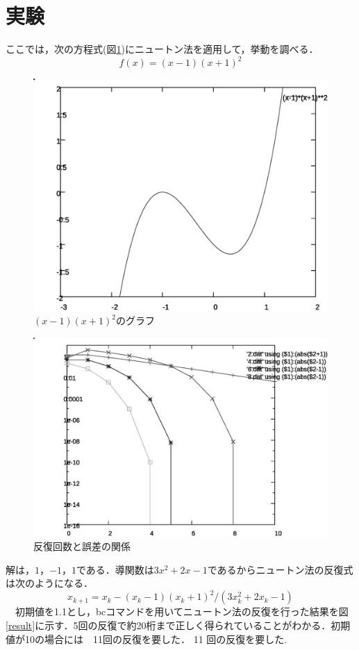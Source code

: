 \documentclass[a4j,11pt]{jarticle}
\begin{document}
\section{実験}
ここでは，次の方程式(図\ref{1})にニュートン法を適用して，挙動を調べる．
\begin{equation}
f(x)=(x-1)(x+1)^2
\label{eq:fx}
\end{equation}
\begin{figure}
\includegraphics[scale=0.4]{newton.eps}
\caption{$(x-1)(x+1)^2のグラフ$}
\label{1}
\end{figure}
\begin{figure}[h]
\includegraphics[scale=0.4]{newtonresult.eps}
\caption{反復回数と誤差の関係}
\label{newtonresult}
\end{figure}
解は，$1$，$-1$，$1$である．導関数は$3x^2+2x-1$であるからニュートン法の反復式は次のようになる．
\begin{equation}
x_{k+1}=x_k-(x_k-1)(x_k+1)^2/(3x^2_k+2x_k-1)
\label{newtonrepeat}
\end{equation}
　初期値を1.1とし，bcコマンドを用いてニュートン法の反復を行った結果を図\ref{result}に示す．5回の反復で約20桁まで正しく得られていることがわかる．初期値が10の場合には　11回の反復を要した．
11 回の反復を要した.
\end{document}
